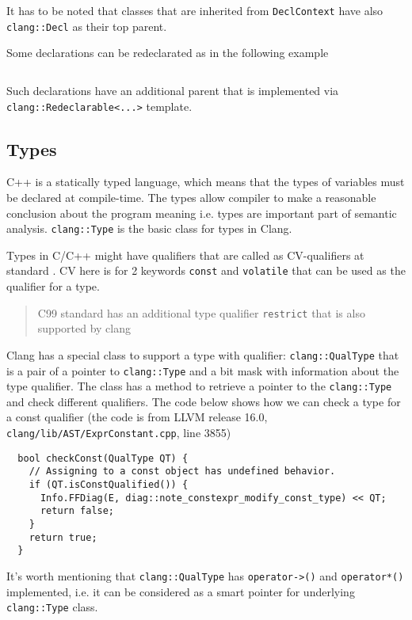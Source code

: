 It has to be noted that classes that are inherited from
\texttt{DeclContext} have also \texttt{clang::Decl} as their
top parent.

Some declarations can be redeclarated as in the following example
\inputminted{c++}{./src/part1/ch2_arch/redeclaration.cpp}
Such declarations have an additional parent that is implemented via
\texttt{clang::Redeclarable<...>} template.

\subsection{Types}
C++ is a statically typed language, which means that the types of
variables must be declared at compile-time. The types allow compiler to make a
reasonable conclusion about the program meaning i.e. types are important part of
semantic analysis. \texttt{clang::Type} is the basic class for types in
Clang.

Types in C/C++ might have qualifiers that are called as CV-qualifiers at
standard \citep[basic.type.qualifier]{standard:cpp20}. CV here is for 2 keywords
\texttt{const} and \texttt{volatile} that can be used as the
qualifier for a type.
\begin{quote}
C99 standard has an additional type qualifier \texttt{restrict} that is
also supported by clang \citep[6.7.3]{standard:c99} 
\end{quote}
Clang has a special class to support a type with qualifier:
\texttt{clang::QualType} that is a pair of a pointer to
\texttt{clang::Type} and a bit mask with information about the type
qualifier. The class has a method to retrieve a pointer to the
\texttt{clang::Type} and check different qualifiers. The code below
shows how we can check a type for a const qualifier (the code is from LLVM
release 16.0, \texttt{clang/lib/AST/ExprConstant.cpp}, line 3855)
\begin{verbatim}
  bool checkConst(QualType QT) {
    // Assigning to a const object has undefined behavior.
    if (QT.isConstQualified()) {
      Info.FFDiag(E, diag::note_constexpr_modify_const_type) << QT;
      return false;
    }
    return true;
  }
\end{verbatim}
It's worth mentioning that \texttt{clang::QualType} has
\texttt{operator->()} and \texttt{operator*()} implemented,
i.e. it can be considered as a smart pointer for underlying
\texttt{clang::Type} class.

